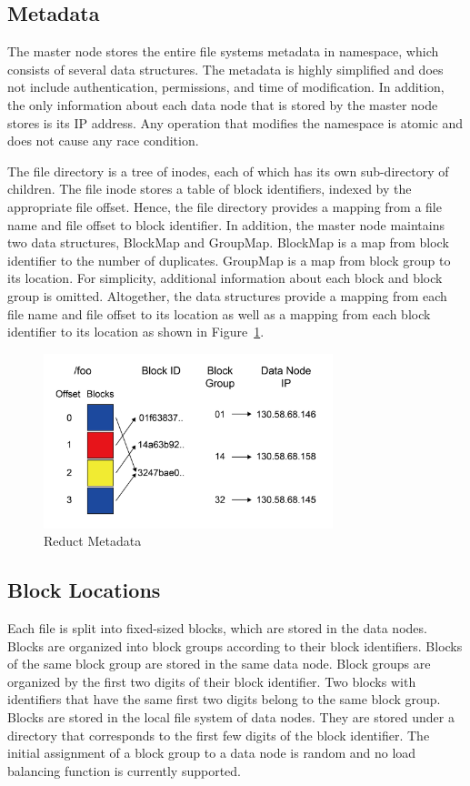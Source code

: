 \documentclass[11pt,twocolumn]{article}
\begin{document}
\subsection{Metadata}\label{arch:metadata}
The master node stores the entire file systems metadata in namespace, which consists of several data structures. The metadata is highly simplified and does not include authentication, permissions, and time of modification. In addition, the only information about each data node that is stored by the master node stores is its IP address. Any operation that modifies the namespace is atomic and does not cause any race condition. 

The file directory is a tree of inodes, each of which has its own sub-directory of children. The file inode stores a table of block identifiers, indexed by the appropriate file offset. Hence, the file directory provides a mapping from a file name and file offset to block identifier. In addition, the master node maintains two data structures, BlockMap and GroupMap. BlockMap is a map from block identifier to the number of duplicates. GroupMap is a map from block group to its location. For simplicity, additional information about each block and block group is omitted. Altogether, the data structures provide a mapping from each file name and file offset to its location as well as a mapping from each block identifier to its location as shown in Figure~\ref{metadata}.

\begin{figure}
  \center
  \includegraphics[width=0.75\textwidth]{metadata.png}
  \caption{{\label{metadata} }Reduct Metadata }
\end{figure}

\subsection{Block Locations}\label{arch:block}
Each file is split into fixed-sized blocks, which are stored in the data nodes. Blocks are organized into block groups according to their block identifiers. Blocks of the same block group are stored in the same data node. Block groups are organized by the first two digits of their block identifier. Two blocks with identifiers that have the same first two digits belong to the same block group. Blocks are stored in the local file system of data nodes.  They are stored under a directory that corresponds to the first few digits of the block identifier. The initial assignment of a block group to a data node is random and no load balancing function is currently supported. 
\end{document}
